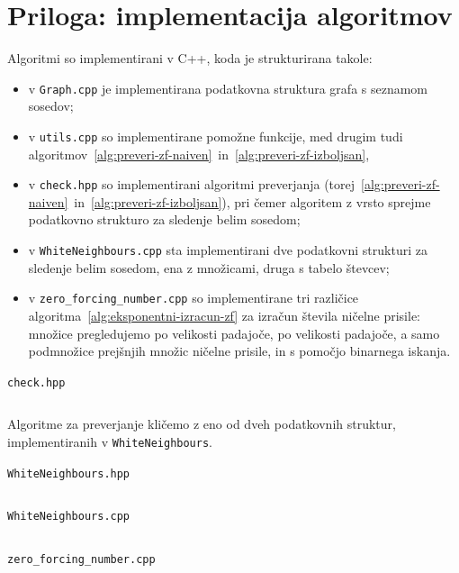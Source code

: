\documentclass[12pt,a4paper,twoside]{article}
\newcommand{\mintedtitle}[1]{\vspace{2mm} \noindent \texttt{#1} \vspace{-5mm}}
\theoremstyle{definition} %
\theoremstyle{plain} %
\numberwithin{equation}{section}  %
\begin{document}
\section{Priloga: implementacija algoritmov}
\label{sec:algoritmi}

Algoritmi so implementirani v C++, koda je strukturirana takole:
\begin{itemize}
    \item v \texttt{Graph.cpp} je implementirana podatkovna struktura grafa s seznamom sosedov;
    \item v \texttt{utils.cpp} so implementirane pomožne funkcije, med drugim tudi algoritmov~\ref{alg:preveri-zf-naiven}~in~\ref{alg:preveri-zf-izboljsan},
    \item v \texttt{check.hpp} so implementirani algoritmi preverjanja (torej~\ref{alg:preveri-zf-naiven}~in~\ref{alg:preveri-zf-izboljsan}), pri čemer algoritem z vrsto sprejme podatkovno strukturo za sledenje belim sosedom;
    \item v \texttt{WhiteNeighbours.cpp} sta implementirani dve podatkovni strukturi za sledenje belim sosedom, ena z množicami, druga s tabelo števcev;
    \item v \texttt{zero\_forcing\_number.cpp} so implementirane tri različice algoritma~\ref{alg:eksponentni-izracun-zf} za izračun števila ničelne prisile: množice pregledujemo po velikosti padajoče, po velikosti padajoče, a samo podmnožice prejšnjih množic ničelne prisile, in s pomočjo binarnega iskanja. 
\end{itemize}

\mintedtitle{check.hpp}
\inputminted[firstline=11, lastline=95]{c++}{koda/check.hpp}

Algoritme za preverjanje kličemo z eno od dveh podatkovnih struktur, implementiranih v \texttt{WhiteNeighbours}.

\mintedtitle{WhiteNeighbours.hpp}
\inputminted[firstline=7, lastline=39]{c++}{koda/WhiteNeighbours.hpp}
\mintedtitle{WhiteNeighbours.cpp}
\inputminted[firstline=2]{c++}{koda/WhiteNeighbours.cpp}

\mintedtitle{zero\_forcing\_number.cpp}
\inputminted[firstline=4]{c++}{koda/zero_forcing_number.cpp}
\end{document}
